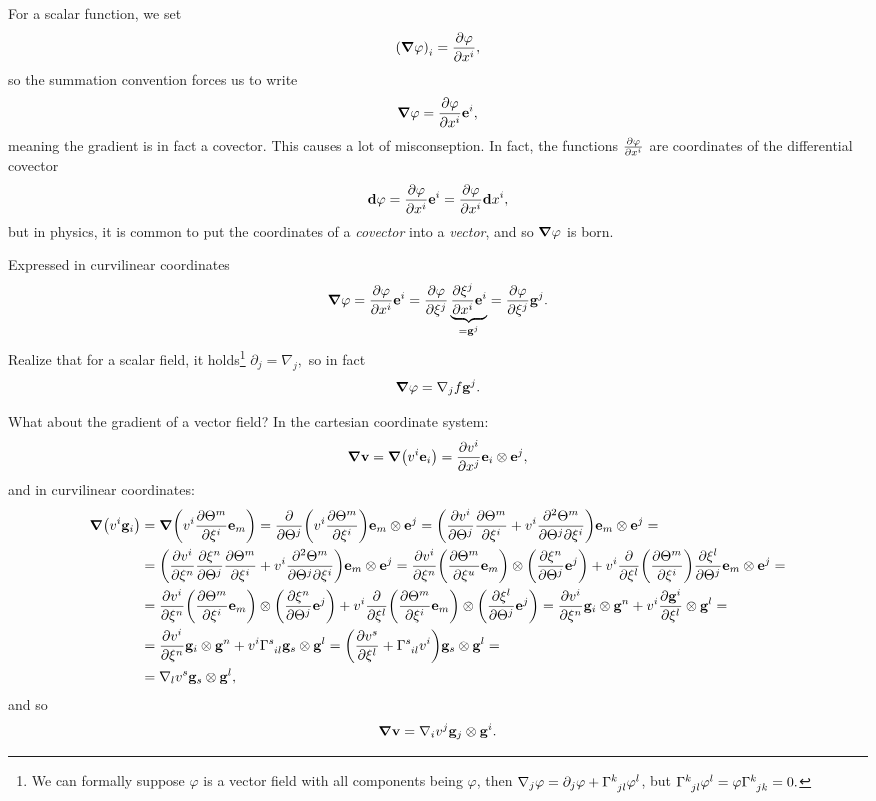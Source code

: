 \documentclass[../main.tex]{subfiles}
\begin{document}
For a scalar function, we set
\[
	\qty(\grad \varphi)_i = \pdv{\varphi}{x^i},
\]
so the summation convention forces us to write
\[
	\grad \varphi = \pdv{\varphi}{x^i} \vb{e}^i,
\]
meaning the gradient is in fact a covector. This causes a lot of misconseption. In fact, the functions $\pdv{\varphi}{x^i}$ are coordinates of the differential covector
\[
	\textbf{d}\varphi = \pdv{\varphi}{x^i}\vb{e}^i = \pdv{\varphi}{x^i}\textbf{d}{x}^i,
\]
but in physics, it is common to put the coordinates of a \textit{covector} into a \textit{vector}, and so $\grad \varphi$ is born.

Expressed in curvilinear coordinates
\[
	\grad \varphi = \pdv{\varphi}{x^i}\vb{e}^i = \pdv{\varphi}{\xi^j}\underbrace{\pdv{\xi^j}{x^i}\vb{e}^i}_{=\vb{g}^j} = \pdv{\varphi}{\xi^j}\vb{g}^j.
\]
Realize that for a scalar field, it holds\footnote{We can formally suppose $\varphi$ is a vector field with all components being $\varphi$, then $\nabla_j \varphi = \partial_{j} \varphi + \Gamma \indices{^k_{jl}}\varphi^l$, but $\Gamma \indices{^k_{jl}} \varphi^l = \varphi \Gamma \indices{^k_{jk}}=0.$} $\partial_{j} = \nabla_j,$ so in fact
\[
	\grad \varphi = \nabla_j f \vb{g}^j.
\]

What about the gradient of a vector field? In the cartesian coordinate system:
\[
	\grad \vb{v} = \grad(v^i \vb{e}_i) = \pdv{v^i}{x^j}\vb{e}_i \otimes \vb{e}^j,
\]
and in curvilinear coordinates:
\begin{align*}
	\grad(v^i \vb{g}_i)& = \grad \qty(v^i \pdv{\Theta^m}{\xi^i}\vb{e}_m) = \pdv{\Theta^j}\qty(v^i \pdv{\Theta^m}{\xi^i})\vb{e}_m \otimes \vb{e}^j = \qty(\pdv{v^i}{\Theta^j} \pdv{\Theta^m}{\xi^i}+v^i \pdv[2]{\Theta^m}{\Theta^j}{\xi^i})\vb{e}_m \otimes \vb{e}^j = \\
			   & = \qty(\pdv{v^i}{\xi^n}\pdv{\xi^n}{\Theta^j}\pdv{\Theta^m}{\xi^i}+v^i \pdv[2]{\Theta^m}{\Theta^j}{\xi^i})\vb{e}_m \otimes \vb{e}^j = \pdv{v^i}{\xi^n} \qty(\pdv{\Theta^m}{\xi^u}\vb{e}_m)\otimes \qty(\pdv{\xi^n}{\Theta^j}\vb{e}^j)+v^i \pdv{\xi^l}\qty(\pdv{\Theta^m}{\xi^i})\pdv{\xi^l}{\Theta^j}\vb{e}_m \otimes \vb{e}^j = \\
			   & = \pdv{v^i}{\xi^n} \qty(\pdv{\Theta^m}{\xi^i}\vb{e}_m)\otimes \qty(\pdv{\xi^n}{\Theta^j}\vb{e}^j)+ v^i \pdv{\xi^l}\qty(\pdv{\Theta^m}{\xi^i}\vb{e}_m)\otimes \qty(\pdv{\xi^l}{\Theta^j}\vb{e}^j) = \pdv{v^i}{\xi^n}\vb{g}_i \otimes \vb{g}^n+ v^i \pdv{\vb{g}^i}{\xi^l} \otimes \vb{g}^l = \\
			   &= \pdv{v^i}{\xi^n}\vb{g}_i \otimes \vb{g}^n + v^i \Gamma \indices{^s_{il}}\vb{g}_s \otimes \vb{g}^l = \qty(\pdv{v^s}{\xi^l}+\Gamma \indices{^s_{il}}v^i)\vb{g}_s \otimes \vb{g}^l = \\
			    & = \nabla_l v^s \vb{g}_s \otimes \vb{g}^l,
\end{align*}
and so
\[
	\grad \vb{v} = \nabla_i v^j \vb{g}_j \otimes \vb{g}^i.
\]
\end{document}
